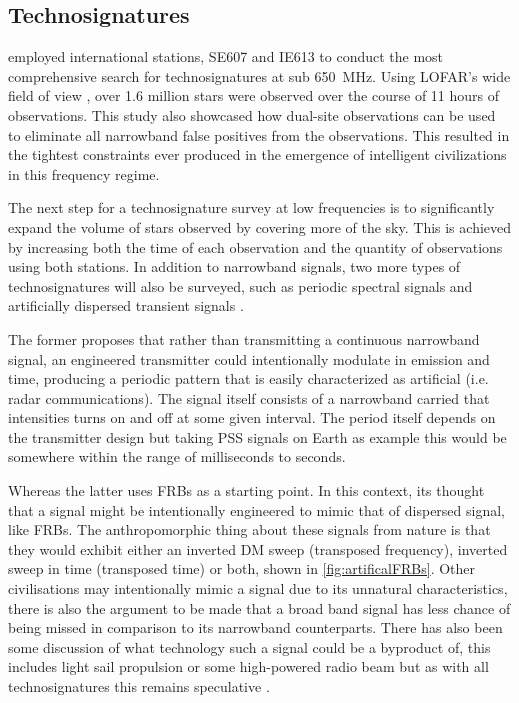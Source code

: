 \subsection{Technosignatures}
 \cite{johnson_simultaneous_2023} employed international stations, SE607 and IE613 to conduct the most comprehensive search for technosignatures at sub 650~MHz. Using LOFAR's wide field of view \citep{van_haarlem_lofar_2013}, over 1.6 million stars were observed over the course of 11 hours of observations. This study also showcased how dual-site observations can be used to eliminate all narrowband false positives from the observations. This resulted in the tightest constraints ever produced in the emergence of intelligent civilizations in this frequency regime.

The next step for a technosignature survey at low frequencies is to significantly expand the volume of stars observed by covering more of the sky. This is achieved by increasing both the time of each observation and the quantity of observations using both stations. In addition to narrowband signals, two more types of technosignatures will also be surveyed, such as periodic spectral signals \citep{edmondson_utilization_2003, suresh_48_2023} and artificially dispersed transient signals \citep{2022VishalPulsed}. 

The former proposes that rather than transmitting a continuous narrowband signal, an engineered transmitter could intentionally modulate in emission and time, producing a periodic pattern that is easily characterized as artificial (i.e. radar communications). The signal itself consists of a narrowband carried that intensities turns on and off at some given interval. The period itself depends on the transmitter design but taking PSS signals on Earth as example this would be somewhere within the range of milliseconds to seconds. 

Whereas the latter uses FRBs as a starting point. In this context, its thought that a signal might be intentionally engineered to mimic that of dispersed signal, like FRBs. The anthropomorphic thing about these signals from nature is that they would exhibit either an inverted DM sweep (transposed frequency), inverted sweep in time (transposed time) or both, shown in \cref{fig:artificalFRBs}. Other civilisations may intentionally mimic a signal due to its unnatural characteristics, there is also the argument to be made that a broad band signal has less chance of being missed in comparison to its narrowband counterparts. There has also been some discussion of what technology such a signal could be a byproduct of, this includes light sail propulsion or some high-powered radio beam but as with all technosignatures this remains speculative \citep{lingam_fast_2017}. 

